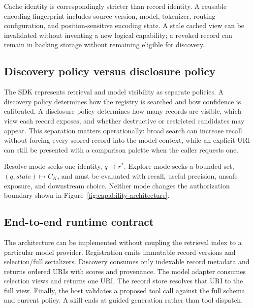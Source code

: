 \documentclass[11pt]{article}
\begin{document}
Cache identity is correspondingly stricter than record identity. A reusable
encoding fingerprint includes source version, model, tokenizer, routing
configuration, and position-sensitive encoding state. A stale cached view can
be invalidated without inventing a new logical capability; a revoked record
can remain in backing storage without remaining eligible for discovery.

\subsection{Discovery policy versus disclosure policy}

The SDK represents retrieval and model visibility as separate policies. A
discovery policy determines how the registry is searched and how confidence is
calibrated. A disclosure policy determines how many records are visible, which
view each record exposes, and whether destructive or restricted candidates
may appear. This separation matters operationally: broad search can increase
recall without forcing every scored record into the model context, while an
explicit URI can still be presented with a comparison palette when the caller
requests one.

Resolve mode seeks one identity, $q\mapsto r^*$. Explore mode seeks a bounded
set, $(q,state)\mapsto C_K$, and must be evaluated with recall, useful
precision, unsafe exposure, and downstream choice. Neither mode changes the
authorization boundary shown in Figure~\ref{fig:capability-architecture}.

\subsection{End-to-end runtime contract}

The architecture can be implemented without coupling the retrieval index to a
particular model provider. Registration emits immutable record versions and
selection/full serializers. Discovery consumes only indexable record metadata
and returns ordered URIs with scores and provenance. The model adapter consumes
selection views and returns one URI. The record store resolves that URI to the
full view. Finally, the host validates a proposed tool call against the full
schema and current policy. A skill ends at guided generation rather than tool
dispatch.
\end{document}
